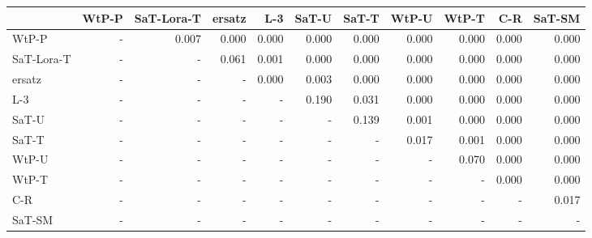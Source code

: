 \begin{tabular}{lrrrrrrrrrr}
\toprule
 & WtP-P & SaT-Lora-T & ersatz & L-3 & SaT-U & SaT-T & WtP-U & WtP-T & C-R & SaT-SM \\
\midrule
WtP-P & - & 0.007 & 0.000 & 0.000 & 0.000 & 0.000 & 0.000 & 0.000 & 0.000 & 0.000 \\
SaT-Lora-T & - & - & 0.061 & 0.001 & 0.000 & 0.000 & 0.000 & 0.000 & 0.000 & 0.000 \\
ersatz & - & - & - & 0.000 & 0.003 & 0.000 & 0.000 & 0.000 & 0.000 & 0.000 \\
L-3 & - & - & - & - & 0.190 & 0.031 & 0.000 & 0.000 & 0.000 & 0.000 \\
SaT-U & - & - & - & - & - & 0.139 & 0.001 & 0.000 & 0.000 & 0.000 \\
SaT-T & - & - & - & - & - & - & 0.017 & 0.001 & 0.000 & 0.000 \\
WtP-U & - & - & - & - & - & - & - & 0.070 & 0.000 & 0.000 \\
WtP-T & - & - & - & - & - & - & - & - & 0.000 & 0.000 \\
C-R & - & - & - & - & - & - & - & - & - & 0.017 \\
SaT-SM & - & - & - & - & - & - & - & - & - & - \\
\bottomrule
\end{tabular}


